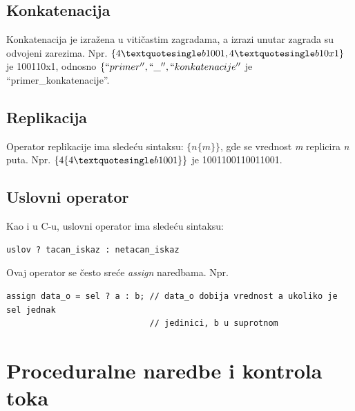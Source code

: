 
\subsection{Konkatenacija}

Konkatenacija je izražena u vitičastim zagradama, a izrazi unutar zagrada su
odvojeni zarezima.
Npr. \(\{4\textquotesingle b1001, 4\textquotesingle b10x1\}\) je 100110x1, odnosno \(\{``primer'', ``\_'',
``konkatenacije''\) je ``primer\_konkatenacije''.


\subsection{Replikacija}

Operator replikacije ima sledeću sintaksu: \(\{n\{m\}\}\), gde se vrednost
\emph{m} replicira \emph{n} puta.
Npr. \(\{4\{4\textquotesingle b1001\}\}\) je 1001100110011001.


\subsection{Uslovni operator}

Kao i u C-u, uslovni operator ima sledeću sintaksu:

\begin{lstlisting}
uslov ? tacan_iskaz : netacan_iskaz
\end{lstlisting}

Ovaj operator se često sreće \emph{assign} naredbama. Npr.

\begin{lstlisting}
assign data_o = sel ? a : b; // data_o dobija vrednost a ukoliko je sel jednak
                             // jedinici, b u suprotnom
\end{lstlisting}


\section{Proceduralne naredbe i kontrola toka}

